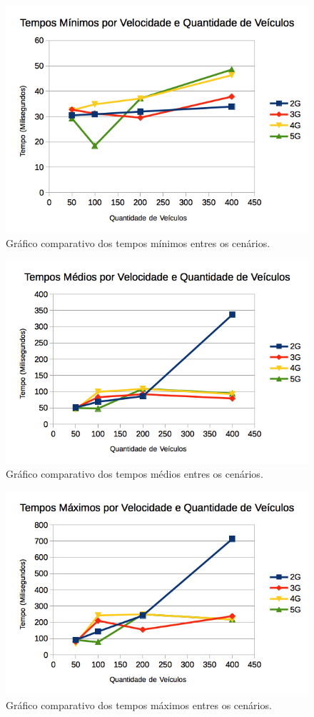 \documentclass[
	12pt,				%
	oneside,			%
	a4paper,			%
	english,			%
	brazil				%
	]{abntex2ppgsi}
\begin{document}
\begin{figure}[t!]
	\centering
	\includegraphics[width=0.7\columnwidth]{images/grafico_tempo_min.png}
	\caption{Gráfico comparativo dos tempos mínimos entres os cenários.}
	\label{fig:graficotempomin}
\end{figure}

\begin{figure}[t!]
	\centering
	\includegraphics[width=0.7\columnwidth]{images/grafico_tempo_medio.png}
	\caption{Gráfico comparativo dos tempos médios entres os cenários.}
	\label{fig:graficotempomedio}
\end{figure}

\begin{figure}[t!]
	\centering
	\includegraphics[width=0.7\columnwidth]{images/grafico_tempo_max.png}
	\caption{Gráfico comparativo dos tempos máximos entres os cenários.}
	\label{fig:graficotempomax}
\end{figure}
\end{document}
